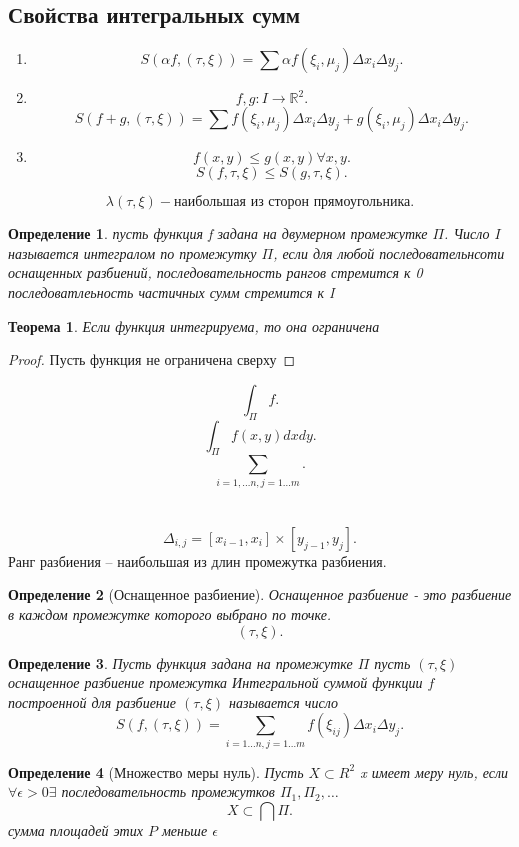 \documentclass[14pt]{extarticle} \usepackage{fontspec}
\newtheorem{theorem}{Теорема}
\newtheorem{definition}{Определение}
\begin{document}
\subsection{Свойства интегральных сумм}
\begin{enumerate}
    \item 
\[
S(\alpha f, (\tau,\xi)) = \sum \alpha f( \xi_{i},\mu_{j}) \Delta x_{i} \Delta y_{j}
.\] 
\item 
    \[
    f,g : I \to \mathbb{R}^2
    .\] 
    \[
    S(f + g, (\tau,\xi)) = \sum f(\xi_{i},\mu_{j}) \Delta x_{i} \Delta y_{j}  +
    g(\xi_{i},\mu_{j}) \Delta x_{i} \Delta y_{j}
    .\] 
\item
    \[
    f(x,y) \le g(x,y) \forall  x,y
    .\] 
    \[
    S(f,\tau,\xi) \le  S(g, \tau ,\xi)
    .\]
\end{enumerate}
\[
    \lambda(\tau,\xi) - \text{наибольшая из сторон прямоугольника}
.\] 
\begin{definition}
    пусть функция f задана на двумерном промежутке $\Pi$. Число  $I$ называется интегралом по промежутку $\Pi$, если для любой последовательнсоти оснащенных разбиений, последовательность рангов стремится к 0 последоватлеьность частичных сумм стремится к I
\end{definition}
\begin{theorem}
    Если функция интегрируема, то она ограничена
\end{theorem}
\begin{proof}
    Пусть функция не ограничена сверху
\end{proof}
\[
\int_{\Pi} f
.\] 
\[
\int_{\Pi} f(x,y) dx dy
.\] 
\[
\sum_{i = 1,\dots n , j = 1 \dots m}
.\] 
\section{}
\[
    \Delta_{i,j} = [x_{i-1},x_{i}] \times [y_{j-1},y_{j}]
.\] 
Ранг разбиения -- наибольшая из длин промежутка разбиения.
\begin{definition}[Оснащенное разбиение]
    Оснащенное разбиение - это разбиение в каждом промежутке которого выбрано по точке.
    \[
        (\tau,\xi)
    .\] 
\end{definition}
\begin{definition}
    Пусть  функция задана на промежутке $\Pi$ пусть  $( \tau,\xi)$ оснащенное разбиение промежутка
    Интегральной суммой функции $f$ построенной для разбиение  $(\tau,\xi)$ называется число 
     \[
    S(f,(\tau,\xi)) = \sum_{i = 1\dots n, j = 1 \dots m} f(\xi_{ij}) \Delta x_{i} \Delta y_{j}
    .\] 
\end{definition}
\begin{definition}[Множество меры нуль]
    Пусть $X \subset R^2$ x имеет меру нуль, если $\forall \epsilon > 0 \exists $ 
    последовательность промежутков $\Pi_1,\Pi_2,\dots$ 
    \[
    X \subset \bigcap \Pi
    .\] 
    сумма площадей этих $P$ меньше  $\epsilon$
\end{definition}
\end{document}
